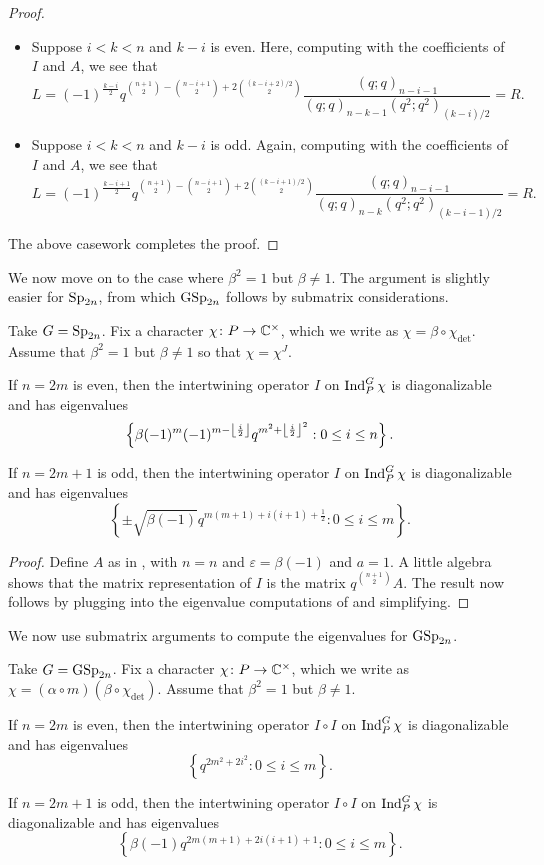 \begin{proof}
\begin{itemize}
        \item Suppose $i<k<n$ and $k-i$ is even. Here, computing with the coefficients of $I$ and $A$, we see that
        \[L=(-1)^{\frac{k-i}2}q^{\binom {n+1}2-\binom{n-i+1}2+2\binom{(k-i+2)/2}2}\frac{(q;q)_{n-i-1}}{(q;q)_{n-k-1}(q^2;q^2)_{(k-i)/2}}=R.\]
        \item Suppose $i<k<n$ and $k-i$ is odd. Again, computing with the coefficients of $I$ and $A$, we see that
        \[L=(-1)^{\frac{k-i+1}2}q^{\binom{n+1}2-\binom{n-i+1}2+2\binom{(k-i+1)/2}2}\frac{(q;q)_{n-i-1}}{(q;q)_{n-k}(q^2;q^2)_{(k-i-1)/2}}=R.\]
    \end{itemize}
    The above casework completes the proof.
\end{proof}
We now move on to the case where $\beta^2=1$ but $\beta\ne1$. The argument is slightly easier for $\mathrm{Sp}_{2n}$, from which $\mathrm{GSp}_{2n}$ follows by submatrix considerations.
\begin{theorem} \label{thm:sp-quadratic-eigens}
    Take $G=\mathrm{Sp}_{2n}$. Fix a character $\chi\colon P\to\mathbb C^\times$, which we write as $\chi=\beta\circ\chi_{\det}$. Assume that $\beta^2=1$ but $\beta\ne1$ so that $\chi=\chi^J$.
    \begin{listalph}
        \item If $n=2m$ is even, then the intertwining operator $I$ on $\operatorname{Ind}_P^G\chi$ is diagonalizable and has eigenvalues
        \[\left\{\beta(-1)^m(-1)^{m-\left\lfloor{\frac i2}\right\rfloor}q^{m^2+\left\lfloor{\frac{i}2}\right\rfloor^2}:0\le i\le n\right\}.\]
        \item If $n=2m+1$ is odd, then the intertwining operator $I$ on $\operatorname{Ind}_P^G\chi$ is diagonalizable and has eigenvalues
        \[\left\{\pm\sqrt{\beta(-1)}q^{m(m+1)+i(i+1)+\frac12}:0\le i\le m\right\}.\]
    \end{listalph}
\end{theorem}
\begin{proof}
    Define $A$ as in , with $n=n$ and $\varepsilon=\beta(-1)$ and $a=1$. A little algebra shows that the matrix representation of $I$ is the matrix $q^{\binom{n+1}2}A$. The result now follows by plugging into the eigenvalue computations of  and simplifying.
\end{proof}
We now use submatrix arguments to compute the eigenvalues for $\mathrm{GSp}_{2n}$.
\begin{theorem}
    Take $G=\mathrm{GSp}_{2n}$. Fix a character $\chi\colon P\to\mathbb C^\times$, which we write as $\chi=(\alpha\circ m)(\beta\circ\chi_{\det})$. Assume that $\beta^2=1$ but $\beta\ne1$.
    \begin{listalph}
        \item If $n=2m$ is even, then the intertwining operator $I\circ I$ on $\operatorname{Ind}_P^G\chi$ is diagonalizable and has eigenvalues
        \[\left\{q^{2m^2+2i^2}:0\le i\le m\right\}.\]
        \item If $n=2m+1$ is odd, then the intertwining operator $I\circ I$ on $\operatorname{Ind}_P^G\chi$ is diagonalizable and has eigenvalues
        \[\left\{\beta(-1)q^{2m(m+1)+2i(i+1)+1}:0\le i\le m\right\}.\]
    \end{listalph}
\end{theorem}
